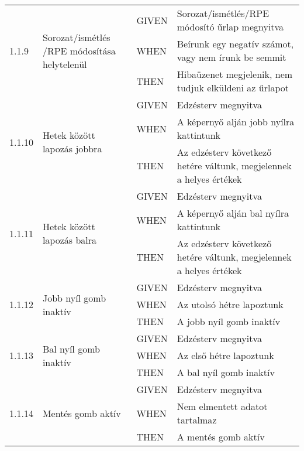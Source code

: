 \begin{center}
\begin{longtable}{ | p{} | p{} | p{} | p{} | }
			\multirow{3}{*}{1.1.9} 
			& \multirow{3}{=}{Sorozat/ismétlés /RPE módosítása helytelenül} 
			& GIVEN 
			& Sorozat/ismétlés/RPE módosító űrlap megnyitva \\
			\cline{3-4}
			& & WHEN 
			& Beírunk egy negatív számot, vagy nem írunk be semmit \\
			\cline{3-4}
			& & THEN 
			& Hibaüzenet megjelenik, nem tudjuk elküldeni az űrlapot \\
			\hline



			\multirow{3}{*}{1.1.10} 
			& \multirow{3}{=}{Hetek között lapozás jobbra} 
			& GIVEN 
			& Edzésterv megnyitva \\
			\cline{3-4}
			& & WHEN 
			& A képernyő alján jobb nyílra kattintunk \\
			\cline{3-4}
			& & THEN 
			& Az edzésterv következő hetére váltunk, megjelennek a helyes értékek \\
			\hline

			\multirow{3}{*}{1.1.11} 
			& \multirow{3}{=}{Hetek között lapozás balra} 
			& GIVEN 
			& Edzésterv megnyitva \\
			\cline{3-4}
			& & WHEN 
			& A képernyő alján bal nyílra kattintunk \\
			\cline{3-4}
			& & THEN 
			& Az edzésterv következő hetére váltunk, megjelennek a helyes értékek \\
			\hline

			\multirow{3}{*}{1.1.12} 
			& \multirow{3}{=}{Jobb nyíl gomb inaktív} 
			& GIVEN 
			& Edzésterv megnyitva \\
			\cline{3-4}
			& & WHEN 
			& Az utolsó hétre lapoztunk \\
			\cline{3-4}
			& & THEN 
			& A jobb nyíl gomb inaktív \\
			\hline

			\multirow{3}{*}{1.1.13} 
			& \multirow{3}{=}{Bal nyíl gomb inaktív} 
			& GIVEN 
			& Edzésterv megnyitva \\
			\cline{3-4}
			& & WHEN 
			& Az első hétre lapoztunk \\
			\cline{3-4}
			& & THEN 
			& A bal nyíl gomb inaktív \\
			\hline

			\multirow{3}{*}{1.1.14} 
			& \multirow{3}{=}{Mentés gomb aktív} 
			& GIVEN 
			& Edzésterv megnyitva \\
			\cline{3-4}
			& & WHEN 
			& Nem elmentett adatot tartalmaz \\
			\cline{3-4}
			& & THEN 
			& A mentés gomb aktív \\
			\hline


\end{longtable}
\end{center}

